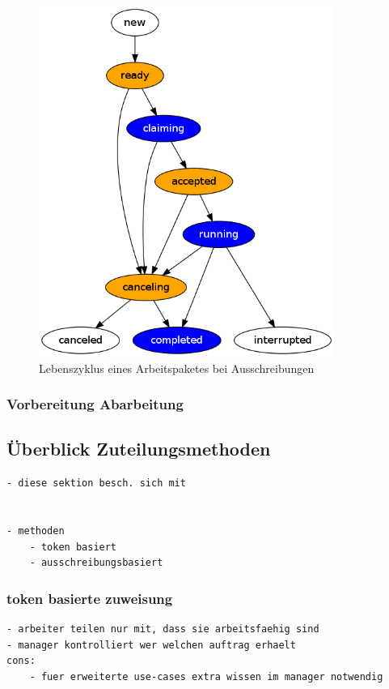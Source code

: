 \begin{figure}[ht] 
  \centering
  \label{fig:lebenszyklus-arbeitspaket}
  \includegraphics[height=4.5in]{imageinput/lebenszyklus-arbeitspaket.png}
  \caption{Lebenszyklus eines Arbeitspaketes bei Ausschreibungen}
\end{figure}


\subsubsection{Vorbereitung Abarbeitung}

\subsection{\"Uberblick Zuteilungsmethoden}


\begin{verbatim}
- diese sektion besch. sich mit


- methoden
    - token basiert
    - ausschreibungsbasiert

\end{verbatim}


\subsubsection{token basierte zuweisung}

\begin{verbatim}
- arbeiter teilen nur mit, dass sie arbeitsfaehig sind
- manager kontrolliert wer welchen auftrag erhaelt
cons:
    - fuer erweiterte use-cases extra wissen im manager notwendig
\end{verbatim}

